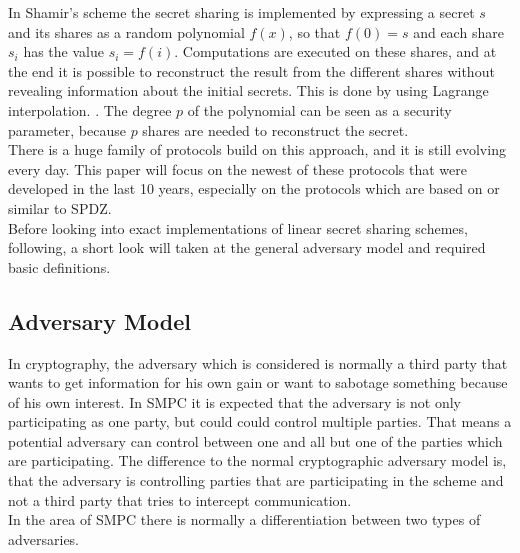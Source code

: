 \documentclass[english,runningheads,a4paper]{llncs}[2018/03/10]
\begin{document}
In Shamir's scheme the secret sharing is implemented by expressing a secret $s$ and its shares as a random polynomial $f(x)$, so that $f(0)=s$ and each share $s_i$ has the value $s_i=f(i)$. Computations are executed on these shares, and at the end it is possible to reconstruct the result from the different shares without revealing information about the initial secrets. This is done by using Lagrange interpolation. . The degree $p$ of the polynomial can be seen as a security parameter, because $p$ shares are needed to reconstruct the secret.\\
There is a huge family of protocols build on this approach, and it is still evolving every day. This paper will focus on the newest of these protocols that were developed in the last 10 years, especially on the protocols which are based on or similar to SPDZ. \\
Before looking into exact implementations of linear secret sharing schemes, following, a short look will taken at the general adversary model and required basic definitions.
\subsection{Adversary Model}
In cryptography, the adversary which is considered is normally a third party that wants to get information for his own gain or want to sabotage something because of his own interest. In SMPC it is expected that the adversary is not only participating as one party, but could could control multiple parties. That means a potential adversary can control between one and all but one of the parties which are participating. The difference to the normal cryptographic adversary model is, that the adversary is controlling parties that are participating in the scheme and not a third party that tries to intercept communication.\\
In the area of SMPC there is normally a differentiation between two types of adversaries.
\end{document}
